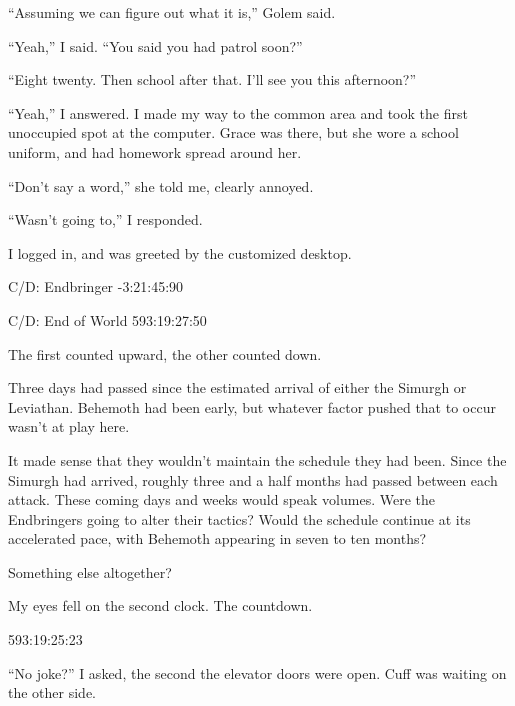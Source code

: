 ``Assuming we can figure out what it is,'' Golem said.



``Yeah,'' I said. ``You said you had patrol soon?''



``Eight twenty.  Then school after that.  I'll see you this afternoon?''



``Yeah,'' I answered.  I made my way to the common area and took the first unoccupied spot at the computer.  Grace was there, but she wore a school uniform, and had homework spread around her.



``Don't say a word,'' she told me, clearly annoyed.



``Wasn't going to,'' I responded.



I logged in, and was greeted by the customized desktop.



C/D: Endbringer
-3:21:45:90



C/D: End of World
593:19:27:50



The first counted upward, the other counted down.



Three days had passed since the estimated arrival of either the Simurgh or Leviathan.  Behemoth had been early, but whatever factor pushed that to occur wasn't at play here.



It made sense that they wouldn't maintain the schedule they had been.  Since the Simurgh had arrived, roughly three and a half months had passed between each attack.
These coming days and weeks would speak volumes.  Were the Endbringers going to alter their tactics?  Would the schedule continue at its accelerated pace, with Behemoth appearing in seven to ten months?



Something else altogether?



My eyes fell on the second clock.  The countdown.



593:19:25:23



\sectionbreak



``No joke?'' I asked, the second the elevator doors were open.  Cuff was waiting on the other side.



